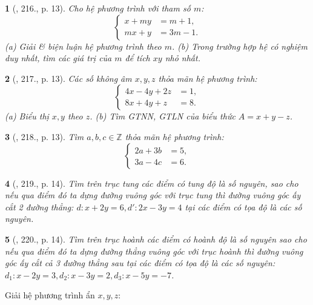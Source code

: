 \documentclass{article}
\newtheorem{baitoan}{}
\begin{document}
\begin{baitoan}[\cite{Binh_Toan_9_tap_2}, 216., p. 13]
	Cho hệ phương trình với tham số $m$:
	\begin{equation*}
		\left\{\begin{split}
			x + my &= m + 1,\\
			mx + y &= 3m - 1.
		\end{split}\right.
	\end{equation*}
	(a) Giải \& biện luận hệ phương trình theo $m$. (b) Trong trường hợp hệ có nghiệm duy nhất, tìm các giá trị của $m$ để tích $xy$ nhỏ nhất.
\end{baitoan}

\begin{baitoan}[\cite{Binh_Toan_9_tap_2}, 217., p. 13]
	Các số không âm $x,y,z$ thỏa mãn hệ phương trình:
	\begin{equation*}
		\left\{\begin{split}
			4x - 4y + 2z &= 1,\\
			8x + 4y + z &= 8.
		\end{split}\right.
	\end{equation*}
	(a) Biểu thị $x,y$ theo $z$. (b) Tìm {\rm GTNN, GTLN} của biểu thức $A = x + y - z$.
\end{baitoan}

\begin{baitoan}[\cite{Binh_Toan_9_tap_2}, 218., p. 13]
	Tìm $a,b,c\in\mathbb{Z}$ thỏa mãn hệ phương trình:
	\begin{equation*}
		\left\{\begin{split}
			2a + 3b &= 5,\\
			3a - 4c &= 6.
		\end{split}\right.
	\end{equation*}
\end{baitoan}

\begin{baitoan}[\cite{Binh_Toan_9_tap_2}, 219., p. 14]
	Tìm trên trục tung các điểm có tung độ là số nguyên, sao cho nếu qua điểm đó ta dựng đường vuông góc với trục tung thì đường vuông góc ấy cắt 2 đường thẳng: $d:x + 2y = 6,d':2x - 3y = 4$ tại các điểm có tọa độ là các số nguyên.
\end{baitoan}

\begin{baitoan}[\cite{Binh_Toan_9_tap_2}, 220., p. 14]
	Tìm trên trục hoành các điểm có hoành độ là số nguyên sao cho nếu qua điểm đó ta dựng đường thẳng vuông góc với trục hoành thì đường vuông góc ấy cắt cả 3 đường thẳng sau tại các điểm có tọa độ là các số nguyên: $d_1:x - 2y = 3,d_2:x - 3y = 2,d_3:x - 5y = -7$.
\end{baitoan}
Giải hệ phương trình ẩn $x,y,z$:
\end{document}

